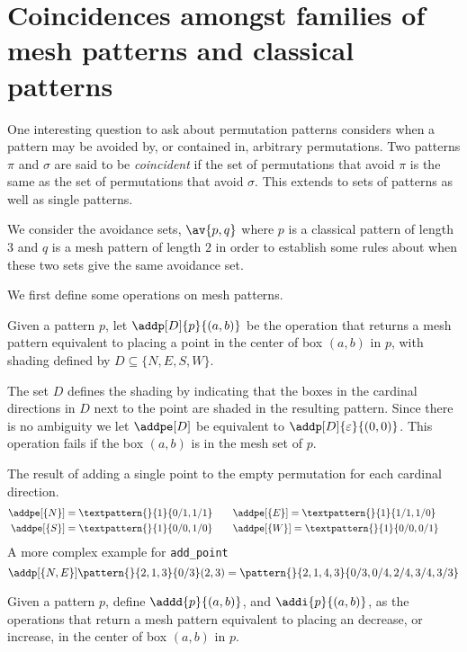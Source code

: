 \section{Coincidences amongst families of mesh patterns and classical patterns}
One interesting question to ask about permutation patterns considers when a
pattern may be avoided by, or contained in, arbitrary permutations. Two
patterns \(\pi\) and \(\sigma\) are said to be \emph{coincident} if the set
of permutations that avoid \(\pi\) is the same as the set of permutations that
avoid \(\sigma\). This extends to sets of patterns as well as single patterns.

We consider the avoidance sets, \(\av{p,q}\) where \(p\) is a classical pattern
of length \(3\) and \(q\) is a mesh pattern of length \(2\) in order to
establish some rules about when these two sets give the same avoidance set.

We first define some operations on mesh patterns.
\begin{definition}
Given a pattern \(p\), let \(\addp[D]{p}{(a,b)}\) be the operation that returns
a mesh pattern equivalent to placing a point in the center of box \((a,b)\) in
\(p\), with shading defined by \(D\subseteq\{N,E,S,W\}\).
\end{definition}
The set \(D\) defines the shading by indicating that the boxes in the cardinal
directions in \(D\) next to the point are shaded in the resulting pattern.
Since there is no ambiguity we let \(\addpe[D]\) be equivalent to \(\addp[D]{\varepsilon}{(0,0)}\).
This operation fails if the box \((a,b)\) is in the mesh set of \(p\).

\begin{example}
    The result of adding a single point to the empty permutation for each cardinal direction.
 \begin{align*}
     \addpe[\{N\}] = \textpattern{}{1}{0/1,1/1} &\qquad\addpe[\{E\}] =\textpattern{}{1}{1/1,1/0} \qquad \\
     \addpe[\{S\}] = \textpattern{}{1}{0/0,1/0} &\qquad\addpe[\{W\}] =\textpattern{}{1}{0/0,0/1} \qquad
\end{align*}
    A more complex example for \texttt{add\_point}
\begin{equation*}
\addp[\{N,E\}]{\pattern{}{2,1,3}{0/3}}{(2,3)} = \pattern{}{2,1,4,3}{0/3,0/4,2/4,3/4,3/3}
\end{equation*}
\end{example}

\begin{definition}
    Given a pattern \(p\), define \(\addd{p}{(a,b)}\), and \(\addi{p}{(a,b)}\),
    as the operations that return a mesh pattern equivalent to placing an
    decrease, or increase, in the center of box \((a,b)\) in \(p\).
\end{definition}

